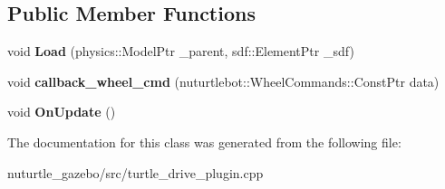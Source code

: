 \subsection*{Public Member Functions}
\begin{DoxyCompactItemize}
\item 
\mbox{\label{classgazebo_1_1TurtleDrivePlugin_afde78faf88cde0df02bf1c8780777ba7}} 
void {\bfseries Load} (physics\+::\+Model\+Ptr \+\_\+parent, sdf\+::\+Element\+Ptr \+\_\+sdf)
\item 
\mbox{\label{classgazebo_1_1TurtleDrivePlugin_a7eec7e21f3378aed676cc546692c55db}} 
void {\bfseries callback\+\_\+wheel\+\_\+cmd} (nuturtlebot\+::\+Wheel\+Commands\+::\+Const\+Ptr data)
\item 
\mbox{\label{classgazebo_1_1TurtleDrivePlugin_afb0469767e16f4d12e1c854acf43299a}} 
void {\bfseries On\+Update} ()
\end{DoxyCompactItemize}


The documentation for this class was generated from the following file\+:\begin{DoxyCompactItemize}
\item 
nuturtle\+\_\+gazebo/src/turtle\+\_\+drive\+\_\+plugin.\+cpp\end{DoxyCompactItemize}
